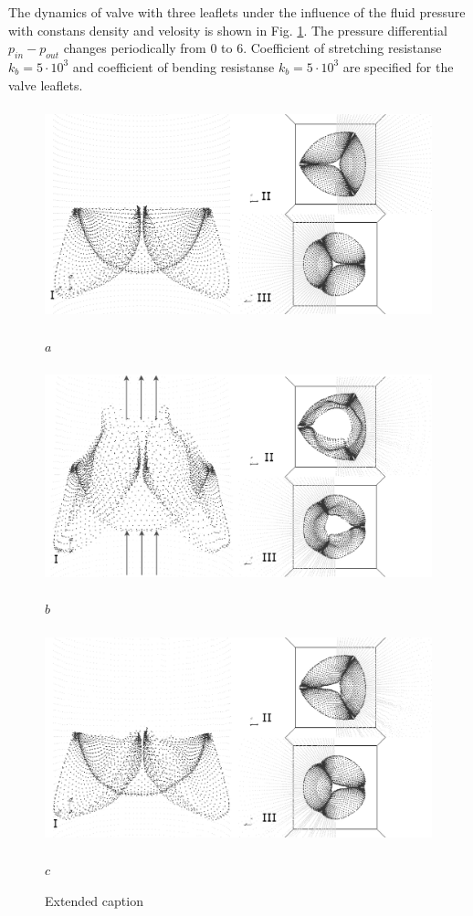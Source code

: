 \documentclass[runningheads,a4paper]{llncs}
\begin{document}
The dynamics of valve with three leaflets under the influence of the fluid pressure with constans density and velosity is shown in Fig. \ref{fig:valve_1}.
The pressure differential $p_{in} - p_{out}$ changes periodically from 0 to 6. Coefficient of stretching resistanse $k_b = 5 \cdot 10^3$ and coefficient of
bending resistanse $k_b = 5 \cdot 10^3$ are specified for the valve leaflets.


\begin{figure}
\centering
\includegraphics[height=6.2cm]{images/valve_1_gray.png}

$a$

\includegraphics[height=6.2cm]{images/valve_2_gray.png}

$b$

\includegraphics[height=6.2cm]{images/valve_3_gray.png}

$c$

\caption{Extended caption}
\label{fig:valve_1}
\end{figure}
\end{document}
